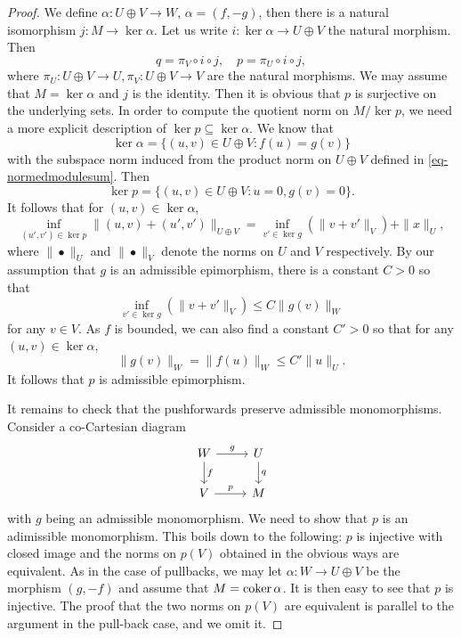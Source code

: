 \begin{proof}
    We define $\alpha:U\oplus V\rightarrow W$, $\alpha=(f,-g)$, then there is a natural isomorphism $j:M\rightarrow \ker \alpha$. Let us write $i:\ker \alpha\rightarrow U\oplus V$ the natural morphism. Then
    \[
        q=\pi_V\circ i \circ j,\quad p=\pi_U\circ i \circ j,  
    \]
    where $\pi_U:U\oplus V\rightarrow U,\pi_V:U\oplus V\rightarrow V$ are the natural morphisms. We may assume that $M=\ker \alpha$ and $j$ is the identity. Then it is obvious that $p$ is surjective on the underlying sets. In order to compute the quotient norm on  $M/\ker p$, we need a more explicit description of $\ker p\subseteq \ker \alpha$. We know that 
    \[
        \ker \alpha=\{(u,v)\in U\oplus V: f(u)=g(v)\}  
    \]
    with the subspace norm induced from the product norm on $U\oplus V$ defined in \eqref{eq-normedmodulesum}. Then
    \[
        \ker p=\{(u,v)\in U\oplus V:u=0, g(v)=0\}.    
    \]
    It follows that for $(u,v)\in \ker \alpha$,
    \[
        \inf_{(u',v')\in \ker p} \|(u,v)+(u',v')\|_{U\oplus V}=\inf_{v'\in \ker g} (\|v+v'\|_V)+ \|x\|_U,
    \]
    where $\|\bullet\|_U$ and $\|\bullet\|_V$ denote the norms on $U$ and $V$ respectively. By our assumption that $g$ is an admissible epimorphism, there is a constant $C>0$ so that 
    \[
        \inf_{v'\in \ker g} (\|v+v'\|_V)\leq C\|g(v)\|_W
    \]
    for any $v\in V$.
    As $f$ is bounded, we can also find a constant $C'>0$ so that for any $(u,v)\in \ker \alpha$, 
    \[
        \|g(v)\|_W=\|f(u)\|_W\leq C'\|u\|_U.
    \]
    It follows that $p$ is admissible epimorphism.

    It remains to check that the pushforwards preserve admissible monomorphisms. Consider a co-Cartesian diagram
    \[
        \begin{tikzcd}
            W \arrow[r, "g"] \arrow[d, "f"]  & U \arrow[d, "q"] \\
            V \arrow[r, "p"]                                               & M               
        \end{tikzcd}  
    \]
    with $g$ being an admissible monomorphism. We need to show that $p$ is an adimissible monomorphism. This boils down to the following: $p$ is injective with closed image and the norms on $p(V)$ obtained in the obvious ways are equivalent.
    As in the case of pullbacks, we may let $\alpha:W\rightarrow U\oplus V$ be the  morphism $(g,-f)$ and assume that $M=\operatorname{coker} \alpha$. It is then easy to see that $p$ is injective. The proof that the two norms on $p(V)$ are equivalent is parallel to the argument in the pull-back case, and we omit it.


\end{proof}
